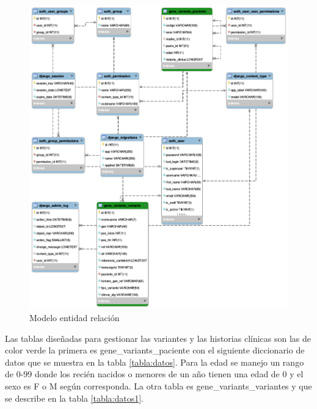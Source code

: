 \begin{figure}[H]
	\centering
	\includegraphics[width=1\textwidth]{Kap3/EER}
	\caption{Modelo entidad relación} \label{fig:t}
\end{figure}

Las tablas diseñadas para gestionar las variantes y las historias clínicas son las de color verde la primera es gene\_variants\_paciente con el siguiente diccionario de datos que se muestra en la tabla \ref{tabla:datos}. Para la edad se manejo un rango de 0-99 donde los recién nacidos  o menores de un año tienen una edad de 0 y el sexo es F o M según corresponda. La otra tabla es gene\_variants\_variantes y que se describe en la tabla \ref{tabla:datos1}.


